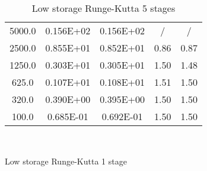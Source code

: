 \documentclass[pdftex,preprint,3p,times,numbers]{elsarticle}
\begin{document}
\begin{table}[!ht]
\begin{subtable}[b]{0.45\textwidth}
{\begin{tabular}{ccccc}
      \hline
      5000.0          &  0.156E+02    &  0.156E+02    & /             & /             \\
      2500.0          &  0.855E+01    &  0.852E+01    & 0.86          & 0.87          \\
      1250.0          &  0.303E+01    &  0.305E+01    & 1.50          & 1.48          \\
       625.0          &  0.107E+01    &  0.108E+01    & 1.51          & 1.50          \\
       320.0          &  0.390E+00    &  0.395E+00    & 1.50          & 1.50          \\
       100.0          &  0.685E-01    &  0.692E-01    & 1.50          & 1.50          \\
      \bottomrule
    \end{tabular}}
  \end{subtable}\\
  \begin{subtable}[b]{0.45\textwidth}
    \centering
    \caption{Low storage Runge-Kutta 1 stage}\label{tab:oscillation-ls-rk-1}
  \end{subtable}\quad%
  \begin{subtable}[b]{0.45\textwidth}
    \centering
    \caption{Low storage Runge-Kutta 5 stages}\label{tab:oscillation-ls-rk-5}
\end{subtable}
\end{table}
\end{document}
